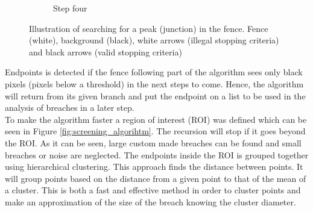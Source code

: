 \documentclass[../Head/Main.tex]{subfiles}
\begin{document}
\begin{figure}[H]
\begin{subfigure}{.24\textwidth}
        \caption{Step four}
        \label{fig:peak_search_step4}
    \end{subfigure}
    \caption{Illustration of searching for a peak (junction) in the fence.  Fence (white), background (black), white arrows (illegal stopping criteria) and black arrows (valid stopping criteria)}
    \label{fig:peak_search}
\end{figure}
\vspace{-15pt}
Endpoints is detected if the fence following part of the algorithm sees only black pixels (pixels below a threshold) in the next steps to come. Hence, the algorithm will return from its given branch and put the endpoint on a list to be used in the analysis of breaches in a later step.\\
To make the algorithm faster a region of interest (ROI) was defined which can be seen in Figure \ref{fig:screening_algorihtm}. The recursion will stop if it goes beyond the ROI. As it can be seen, large custom made breaches can be found and small breaches or noise are neglected. The endpoints inside the ROI is grouped together using hierarchical clustering. This approach finds the distance between points. It will group points based on the distance from a given point to that of the mean of a cluster. This is both a fast and effective method in order to cluster points and make an approximation of the size of the breach knowing the cluster diameter.     
\end{document}
